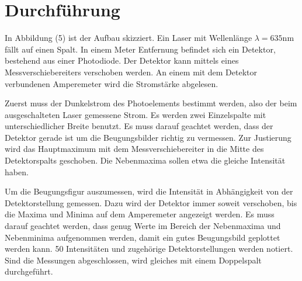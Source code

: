 \section{Durchführung}
\label{sec:Durchführung}

In Abbildung (5) ist der Aufbau skizziert. Ein Laser mit Wellenlänge $\lambda = 635 \si{\nano\meter}$ fällt auf einen Spalt. In einem Meter Entfernung befindet sich ein Detektor, bestehend aus einer Photodiode. Der Detektor kann mittels eines Messverschiebereiters verschoben werden.
An einem mit dem Detektor verbundenen Amperemeter wird die Stromstärke abgelesen.

\noindent Zuerst muss der Dunkelstrom des Photoelements bestimmt werden, also der beim ausgeschalteten Laser gemessene Strom.
Es werden zwei Einzelspalte mit unterschiedlicher Breite benutzt. Es muss darauf geachtet werden, dass der Detektor gerade ist um die Beugungsbilder richtig zu vermessen.
Zur Justierung wird das Hauptmaximum mit dem Messverschiebereiter in die Mitte des Detektorspalts geschoben. Die Nebenmaxima sollen etwa die gleiche Intensität haben.

\noindent Um die Beugungsfigur auszumessen, wird die Intensität in Abhängigkeit von der Detektorstellung gemessen. Dazu wird der Detektor immer soweit verschoben, bis die Maxima und Minima auf dem Amperemeter angezeigt werden. Es muss darauf geachtet werden, dass genug Werte im Bereich der Nebenmaxima und Nebenminima aufgenommen werden, damit ein gutes Beugungsbild geplottet werden kann.
50 Intensitäten und zugehörige Detektorstellungen werden notiert. 
Sind die Messungen abgeschlossen, wird gleiches mit einem Doppelspalt durchgeführt.
